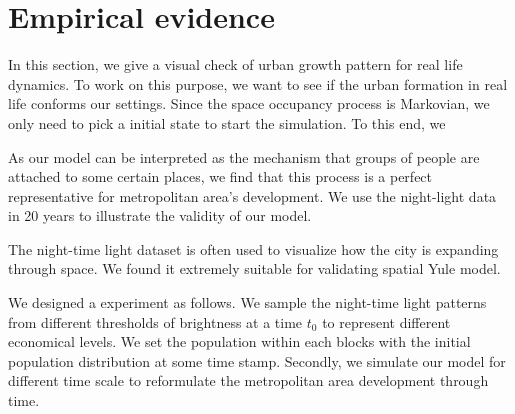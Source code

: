 \documentclass[aps,prl]{revtex4-2}
\begin{document}
\section{Empirical evidence}

In this section, we give a visual check of urban growth pattern for real life dynamics. To work on this purpose, we want to see if the urban formation in real life conforms our settings. Since the space occupancy process is Markovian, we only need to pick a initial state to start the simulation. To this end, we 

As our model can be interpreted as the mechanism that groups of people are attached to some certain places, we find that this process is a perfect representative for metropolitan area's development. We use the night-light data in 20 years to illustrate the validity of our model. 

The night-time light dataset is often used to visualize how the city is expanding through space. We found it extremely suitable for validating spatial Yule model. 

We designed a experiment as follows. We sample the night-time light patterns from different thresholds of brightness at a time $t_0$ to represent different economical levels. We set the population within each blocks with the initial population distribution at some time stamp. Secondly, we simulate our model for different time scale to reformulate the metropolitan area development through time. 



    
\end{document}
